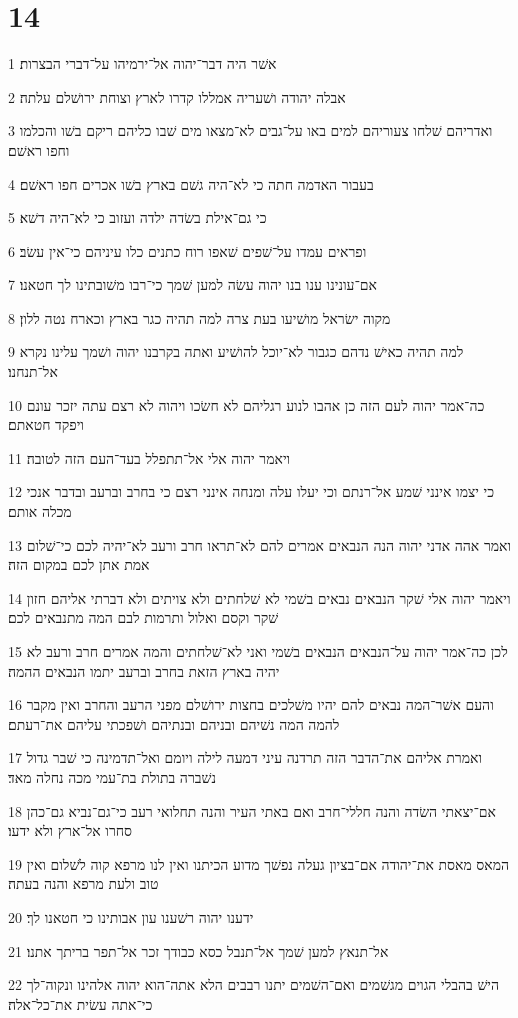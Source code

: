 \chapter{14}

\par 1 אשׁר היה דבר־יהוה אל־ירמיהו על־דברי הבצרות׃
\par 2 אבלה יהודה ושׁעריה אמללו קדרו לארץ וצוחת ירושׁלם עלתה׃
\par 3 ואדריהם שׁלחו צעוריהם למים באו על־גבים לא־מצאו מים שׁבו כליהם ריקם בשׁו והכלמו וחפו ראשׁם׃
\par 4 בעבור האדמה חתה כי לא־היה גשׁם בארץ בשׁו אכרים חפו ראשׁם׃
\par 5 כי גם־אילת בשׂדה ילדה ועזוב כי לא־היה דשׁא׃
\par 6 ופראים עמדו על־שׁפים שׁאפו רוח כתנים כלו עיניהם כי־אין עשׂב׃
\par 7 אם־עונינו ענו בנו יהוה עשׂה למען שׁמך כי־רבו משׁובתינו לך חטאנו׃
\par 8 מקוה ישׂראל מושׁיעו בעת צרה למה תהיה כגר בארץ וכארח נטה ללון׃
\par 9 למה תהיה כאישׁ נדהם כגבור לא־יוכל להושׁיע ואתה בקרבנו יהוה ושׁמך עלינו נקרא אל־תנחנו׃
\par 10 כה־אמר יהוה לעם הזה כן אהבו לנוע רגליהם לא חשׂכו ויהוה לא רצם עתה יזכר עונם ויפקד חטאתם׃
\par 11 ויאמר יהוה אלי אל־תתפלל בעד־העם הזה לטובה׃
\par 12 כי יצמו אינני שׁמע אל־רנתם וכי יעלו עלה ומנחה אינני רצם כי בחרב וברעב ובדבר אנכי מכלה אותם׃
\par 13 ואמר אהה אדני יהוה הנה הנבאים אמרים להם לא־תראו חרב ורעב לא־יהיה לכם כי־שׁלום אמת אתן לכם במקום הזה׃
\par 14 ויאמר יהוה אלי שׁקר הנבאים נבאים בשׁמי לא שׁלחתים ולא צויתים ולא דברתי אליהם חזון שׁקר וקסם ואלול ותרמות לבם המה מתנבאים לכם׃
\par 15 לכן כה־אמר יהוה על־הנבאים הנבאים בשׁמי ואני לא־שׁלחתים והמה אמרים חרב ורעב לא יהיה בארץ הזאת בחרב וברעב יתמו הנבאים ההמה׃
\par 16 והעם אשׁר־המה נבאים להם יהיו משׁלכים בחצות ירושׁלם מפני הרעב והחרב ואין מקבר להמה המה נשׁיהם ובניהם ובנתיהם ושׁפכתי עליהם את־רעתם׃
\par 17 ואמרת אליהם את־הדבר הזה תרדנה עיני דמעה לילה ויומם ואל־תדמינה כי שׁבר גדול נשׁברה בתולת בת־עמי מכה נחלה מאד׃
\par 18 אם־יצאתי השׂדה והנה חללי־חרב ואם באתי העיר והנה תחלואי רעב כי־גם־נביא גם־כהן סחרו אל־ארץ ולא ידעו׃
\par 19 המאס מאסת את־יהודה אם־בציון געלה נפשׁך מדוע הכיתנו ואין לנו מרפא קוה לשׁלום ואין טוב ולעת מרפא והנה בעתה׃
\par 20 ידענו יהוה רשׁענו עון אבותינו כי חטאנו לך׃
\par 21 אל־תנאץ למען שׁמך אל־תנבל כסא כבודך זכר אל־תפר בריתך אתנו׃
\par 22 הישׁ בהבלי הגוים מגשׁמים ואם־השׁמים יתנו רבבים הלא אתה־הוא יהוה אלהינו ונקוה־לך כי־אתה עשׂית את־כל־אלה׃

